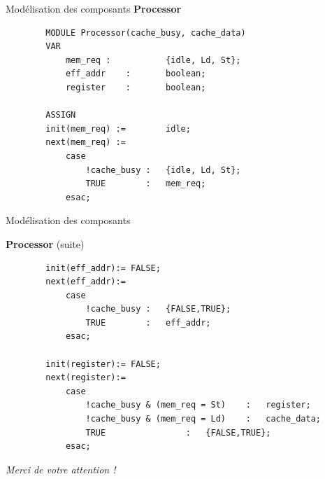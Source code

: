 \documentclass{beamer}
\begin{document}
\begin{frame}[fragile]{Modélisation des composants}
    \textbf{Processor}
    \begin{lstlisting}
        MODULE Processor(cache_busy, cache_data)
        VAR
            mem_req	:	        {idle, Ld, St};
            eff_addr	:	    boolean;
            register	:	    boolean;

        ASSIGN
        init(mem_req) :=        idle;
        next(mem_req) := 
            case
                !cache_busy	:	{idle, Ld, St};
                TRUE		:	mem_req;
            esac;
    \end{lstlisting}
\end{frame}

\begin{frame}[fragile]{Modélisation des composants}
    \addtocounter{framenumber}{-1}
    \textbf{Processor} (suite)
    \begin{lstlisting}
        init(eff_addr):= FALSE; 
        next(eff_addr):=
            case
                !cache_busy	:	{FALSE,TRUE};
                TRUE		:	eff_addr;
            esac;

        init(register):= FALSE; 
        next(register):=
            case
                !cache_busy & (mem_req = St)	:	register;
                !cache_busy & (mem_req = Ld)	:	cache_data;
                TRUE				:	{FALSE,TRUE};
            esac;
    \end{lstlisting}
\end{frame}

\begin{frame}
    \centering \Large
    \emph{Merci de votre attention !}
    
\end{frame}
\end{document}
